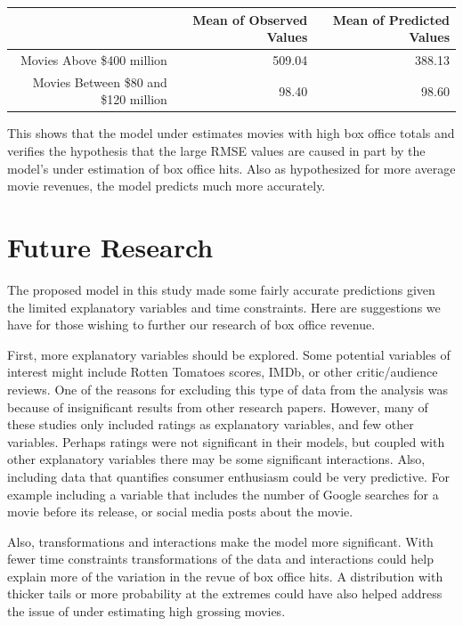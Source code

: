 \documentclass{svproc}
\begin{document}
\begin{table}[ht]
\centering
\begin{tabular}{rrr}
  \hline
 & Mean of Observed Values & Mean of Predicted Values \\ 
  \hline
Movies Above \$400 million & 509.04 & 388.13 \\ 
  Movies Between \$80 and \$120 million & 98.40 & 98.60 \\ 
   \hline
\end{tabular}
\end{table}

This shows that the model under estimates movies with high box office totals and verifies the hypothesis that the large RMSE values are caused in part by the model's under estimation of box office hits. Also as hypothesized for more average movie revenues, the model predicts much more accurately.

\section{Future Research}
The proposed model in this study made some fairly accurate predictions given the limited explanatory variables and time constraints. Here are suggestions we have for those wishing to further our research of box office revenue.

First, more explanatory variables should be explored. Some potential variables of interest might include Rotten Tomatoes scores, IMDb, or other critic/audience reviews. One of the reasons for excluding this type of data from the analysis was because of insignificant results from other research papers. However, many of these studies only included ratings as explanatory variables, and few other variables. Perhaps ratings were not significant in their models, but coupled with other explanatory variables there may be some significant interactions. Also, including data that quantifies consumer enthusiasm could be very predictive. For example including a variable that includes the number of Google searches for a movie before its release, or social media posts about the movie.

Also, transformations and interactions make the model more significant. With fewer time constraints transformations of the data and interactions could help explain more of the variation in the revue of box office hits. A distribution with thicker tails or more probability at the extremes could have also helped address the issue of under estimating high grossing movies.
\end{document}
